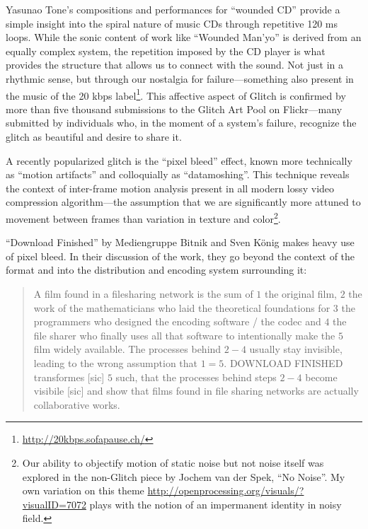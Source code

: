 \documentclass{thesis}
\begin{document}
Yasunao Tone's compositions and performances for ``wounded CD''\cite{media_art_net_media_2010} provide a simple insight into the spiral nature of music CDs through repetitive 120 ms loops. While the sonic content of work like ``Wounded Man'yo'' is derived from an equally complex system, the repetition imposed by the CD player is what provides the structure that allows us to connect with the sound. Not just in a rhythmic sense, but through our nostalgia for failure---something also present in the music of the 20 kbps label\footnote{\url{http://20kbps.sofapause.ch/}}. This affective aspect of Glitch is confirmed by more than five thousand submissions to the Glitch Art Pool on Flickr\cite{liminalmike_flickr:glitch_????}---many submitted by individuals who, in the moment of a system's failure, recognize the glitch as beautiful and desire to share it.
	
A recently popularized glitch is the ``pixel bleed''\cite{john_michael_boling_rhizome_????} effect, known more technically as ``motion artifacts'' and colloquially as ``datamoshing''. This technique reveals the context of inter-frame motion analysis present in all modern lossy video compression algorithm---the assumption that we are significantly more attuned to movement between frames than variation in texture and color\footnote{Our ability to objectify motion of static noise but not noise itself was explored in the non-Glitch piece by Jochem van der Spek, ``No Noise''\cite{jochem_van_der_spek_no_2001}. My own variation on this theme \url{http://openprocessing.org/visuals/?visualID=7072} plays with the notion of an impermanent identity in noisy field.}.

``Download Finished'' by Mediengruppe Bitnik and Sven K\"onig\cite{!mediengruppe_bitnik_and_sven_knig_download_????}  makes heavy use of pixel bleed. In their discussion of the work, they go beyond the context of the format and into the distribution and encoding system surrounding it:

	\begin{quote}
	A film found in a filesharing network is the sum of $1$ the original film, $2$ the work of the mathematicians who laid the theoretical foundations for $3$ the programmers who designed the encoding software / the codec and $4$ the file sharer who finally uses all that software to intentionally make the $5$ film widely available. The processes behind $2-4$ usually stay invisible, leading to the wrong assumption that $1=5$. DOWNLOAD FINISHED transformes [sic] $5$ such, that the processes behind steps $2-4$ become visibile [sic] and show that films found in file sharing networks are actually collaborative works.
	\end{quote}
	
\end{document}
